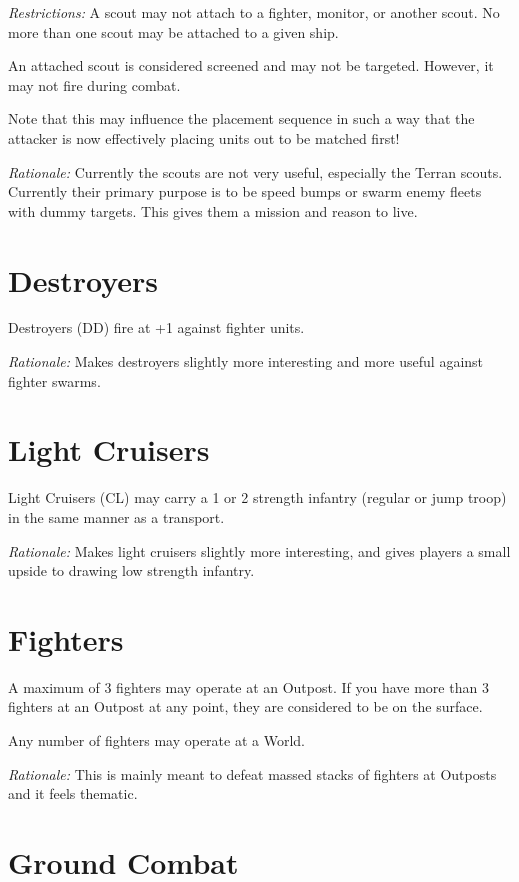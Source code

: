 \documentclass[a4paper,11pt]{article}
\begin{document}
\textit{Restrictions:} A scout may not attach to a fighter, monitor, or another scout. No more than one scout may be attached to a given ship.

An attached scout is considered screened and may not be targeted. However, it may not fire during combat.

Note that this may influence the placement sequence in such a way that the attacker is now effectively placing units out to be matched first!

\textit{Rationale:} Currently the scouts are not very useful, especially the Terran scouts. Currently their primary purpose is to be speed bumps or swarm enemy fleets with dummy targets. This gives them a mission and reason to live.

\section{Destroyers}

Destroyers (DD) fire at +1 against fighter units.

\textit{Rationale:} Makes destroyers slightly more interesting and more useful against fighter swarms.

\section{Light Cruisers}

Light Cruisers (CL) may carry a 1 or 2 strength infantry (regular or jump troop) in the same manner as a transport.

\textit{Rationale:} Makes light cruisers slightly more interesting, and gives players a small upside to drawing low strength infantry.

\section{Fighters}

A maximum of 3 fighters may operate at an Outpost. If you have more than 3 fighters at an Outpost at any point, they are considered to be on the surface.

Any number of fighters may operate at a World.

\textit{Rationale:} This is mainly meant to defeat massed stacks of fighters at Outposts and it feels thematic.

\section{Ground Combat}
\end{document}
